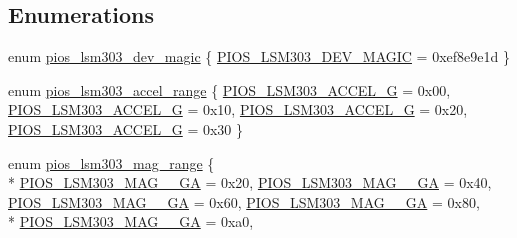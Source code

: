 \subsection*{Enumerations}
\begin{DoxyCompactItemize}
\item 
enum \hyperlink{group___p_i_o_s___l_s_m303_ga541e751cf6c930fc56ab31e10b857a74}{pios\-\_\-lsm303\-\_\-dev\-\_\-magic} \{ \hyperlink{group___p_i_o_s___l_s_m303_gga541e751cf6c930fc56ab31e10b857a74a41c2c7ef1afe6e72780e4cbc0eb274d6}{P\-I\-O\-S\-\_\-\-L\-S\-M303\-\_\-\-D\-E\-V\-\_\-\-M\-A\-G\-I\-C} = 0xef8e9e1d
 \}
\item 
enum \hyperlink{group___p_i_o_s___l_s_m303_gafbb0e59427f40a8d9b0e901af02bb7b3}{pios\-\_\-lsm303\-\_\-accel\-\_\-range} \{ \hyperlink{group___p_i_o_s___l_s_m303_ggafbb0e59427f40a8d9b0e901af02bb7b3a27dfa9deebf2dde3af39a5befaec680b}{P\-I\-O\-S\-\_\-\-L\-S\-M303\-\_\-\-A\-C\-C\-E\-L\-\_\-G} = 0x00, 
\hyperlink{group___p_i_o_s___l_s_m303_ggafbb0e59427f40a8d9b0e901af02bb7b3a17ae55c78fa45d2ce30ed46e9e2f9a00}{P\-I\-O\-S\-\_\-\-L\-S\-M303\-\_\-\-A\-C\-C\-E\-L\-\_\-G} = 0x10, 
\hyperlink{group___p_i_o_s___l_s_m303_ggafbb0e59427f40a8d9b0e901af02bb7b3a9535d578ca9f6242eab4d401727a209d}{P\-I\-O\-S\-\_\-\-L\-S\-M303\-\_\-\-A\-C\-C\-E\-L\-\_\-G} = 0x20, 
\hyperlink{group___p_i_o_s___l_s_m303_ggafbb0e59427f40a8d9b0e901af02bb7b3a964aeb7da75de6e7dd39e0007b3385b9}{P\-I\-O\-S\-\_\-\-L\-S\-M303\-\_\-\-A\-C\-C\-E\-L\-\_\-G} = 0x30
 \}
\item 
enum \hyperlink{group___p_i_o_s___l_s_m303_ga24737af5b503329ca628b921e32ec8d8}{pios\-\_\-lsm303\-\_\-mag\-\_\-range} \{ \\*
\hyperlink{group___p_i_o_s___l_s_m303_gga24737af5b503329ca628b921e32ec8d8a78d5f0759823530a8bc4b6ad007ca51a}{P\-I\-O\-S\-\_\-\-L\-S\-M303\-\_\-\-M\-A\-G\-\_\-\_\-G\-A} = 0x20, 
\hyperlink{group___p_i_o_s___l_s_m303_gga24737af5b503329ca628b921e32ec8d8a4f6e30669e9fe7926bb28fb4e3192262}{P\-I\-O\-S\-\_\-\-L\-S\-M303\-\_\-\-M\-A\-G\-\_\-\_\-G\-A} = 0x40, 
\hyperlink{group___p_i_o_s___l_s_m303_gga24737af5b503329ca628b921e32ec8d8aa3503800030f5377ad55bce47498f260}{P\-I\-O\-S\-\_\-\-L\-S\-M303\-\_\-\-M\-A\-G\-\_\-\_\-G\-A} = 0x60, 
\hyperlink{group___p_i_o_s___l_s_m303_gga24737af5b503329ca628b921e32ec8d8a3a95154f97aab91f26efaa1a2fd8992f}{P\-I\-O\-S\-\_\-\-L\-S\-M303\-\_\-\-M\-A\-G\-\_\-\_\-G\-A} = 0x80, 
\\*
\hyperlink{group___p_i_o_s___l_s_m303_gga24737af5b503329ca628b921e32ec8d8a3d37bcb89bd4512b249617ec810bb6cb}{P\-I\-O\-S\-\_\-\-L\-S\-M303\-\_\-\-M\-A\-G\-\_\-\_\-G\-A} = 0xa0, 

\end{DoxyCompactItemize}
